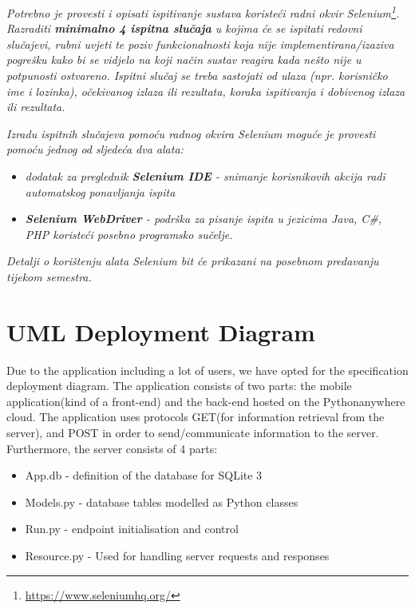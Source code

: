 			 \textit{Potrebno je provesti i opisati ispitivanje sustava koristeći radni okvir Selenium\footnote{\url{https://www.seleniumhq.org/}}. Razraditi \textbf{minimalno 4 ispitna slučaja} u kojima će se ispitati redovni slučajevi, rubni uvjeti te poziv funkcionalnosti koja nije implementirana/izaziva pogrešku kako bi se vidjelo na koji način sustav reagira kada nešto nije u potpunosti ostvareno. Ispitni slučaj se treba sastojati od ulaza (npr. korisničko ime i lozinka), očekivanog izlaza ili rezultata, koraka ispitivanja i dobivenog izlaza ili rezultata.\\ }
			 
			 \textit{Izradu ispitnih slučajeva pomoću radnog okvira Selenium moguće je provesti pomoću jednog od sljedeća dva alata:}
			 \begin{itemize}
			 	\item \textit{dodatak za preglednik \textbf{Selenium IDE} - snimanje korisnikovih akcija radi automatskog ponavljanja ispita	}
			 	\item \textit{\textbf{Selenium WebDriver} - podrška za pisanje ispita u jezicima Java, C\#, PHP koristeći posebno programsko sučelje.}
			 \end{itemize}
		 	\textit{Detalji o korištenju alata Selenium bit će prikazani na posebnom predavanju tijekom semestra.}
			
			\eject 
			
		\section{UML Deployment Diagram}
		
			Due to the application including a lot of users, we have opted for the specification deployment diagram.
			The application consists of two parts: the mobile application(kind of a front-end) and the back-end hosted on the Pythonanywhere cloud. The application uses protocols GET(for information retrieval from the server), and POST in order to send/communicate information to the server. Furthermore, the server consists of 4 parts:
			\begin{itemize}
				\item App.db - definition of the database for SQLite 3
				\item Models.py - database tables modelled as Python classes
				\item Run.py - endpoint initialisation and control
				\item Resource.py - Used for handling server requests and responses
			\end{itemize}
			
